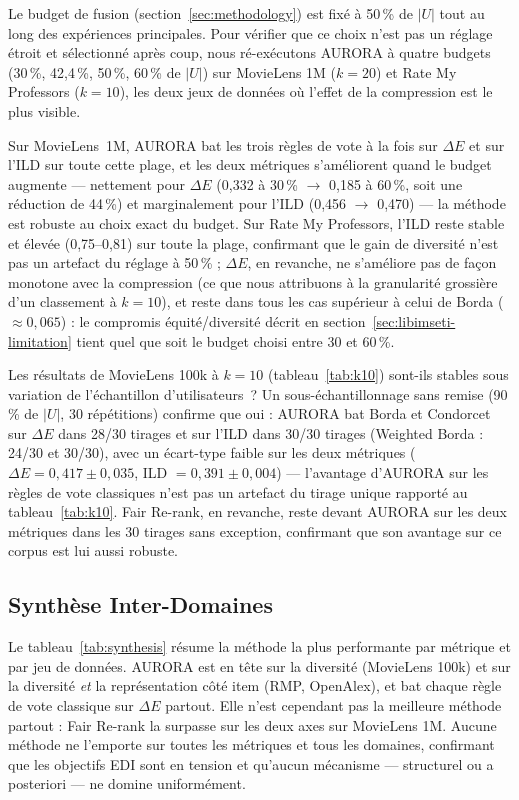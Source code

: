 \documentclass[12pt]{report}
\begin{document}
Le budget de fusion (section~\ref{sec:methodology}) est fixé à 50\,\% de
$|U|$ tout au long des expériences principales. Pour vérifier que ce
choix n'est pas un réglage étroit et sélectionné après coup, nous
ré-exécutons AURORA à quatre budgets (30\,\%, 42,4\,\%, 50\,\%, 60\,\% de
$|U|$) sur MovieLens 1M ($k=20$) et Rate My Professors ($k=10$), les deux
jeux de données où l'effet de la compression est le plus visible.

Sur MovieLens~1M, AURORA bat les trois règles de vote à la fois sur
$\Delta E$ et sur l'ILD sur toute cette plage, et les deux métriques
s'améliorent quand le budget augmente --- nettement pour $\Delta E$
(0,332 à 30\,\% $\to$ 0,185 à 60\,\%, soit une réduction de 44\,\%) et
marginalement pour l'ILD (0,456 $\to$ 0,470) --- la méthode est robuste
au choix exact du budget. Sur Rate My Professors, l'ILD reste
stable et élevée (0,75--0,81) sur toute la plage, confirmant que le gain
de diversité n'est pas un artefact du réglage à 50\,\% ; $\Delta E$, en
revanche, ne s'améliore pas de façon monotone avec la compression (ce
que nous attribuons à la granularité grossière d'un classement à
$k=10$), et reste dans tous les cas supérieur à celui de Borda
($\approx 0{,}065$) : le compromis équité/diversité décrit en
section~\ref{sec:libimseti-limitation} tient quel que soit le budget
choisi entre 30 et 60\,\%.

Les résultats de MovieLens 100k à $k=10$ (tableau~\ref{tab:k10}) sont-ils
stables sous variation de l'échantillon d'utilisateurs~? Un
sous-échantillonnage sans remise (90\,\% de $|U|$, 30 répétitions)
confirme que oui : AURORA bat Borda et Condorcet sur $\Delta E$ dans
28/30 tirages et sur l'ILD dans 30/30 tirages (Weighted Borda : 24/30 et
30/30), avec un écart-type faible sur les deux métriques ($\Delta E =
0{,}417 \pm 0{,}035$, ILD $= 0{,}391 \pm 0{,}004$) --- l'avantage
d'AURORA sur les règles de vote classiques n'est pas un artefact du
tirage unique rapporté au tableau~\ref{tab:k10}. Fair Re-rank, en
revanche, reste devant AURORA sur les deux métriques dans les 30 tirages
sans exception, confirmant que son avantage sur ce corpus est lui aussi
robuste.

\subsection{Synthèse Inter-Domaines}

Le tableau~\ref{tab:synthesis} résume la méthode la plus performante par
métrique et par jeu de données. AURORA est en tête sur la diversité
(MovieLens 100k) et sur la diversité \emph{et} la représentation côté
item (RMP, OpenAlex), et bat chaque règle de vote classique sur
$\Delta E$ partout. Elle n'est cependant pas la meilleure méthode
partout : Fair Re-rank la surpasse sur les deux axes sur MovieLens 1M.
Aucune méthode ne l'emporte sur toutes les métriques et tous les
domaines, confirmant que les objectifs EDI sont en tension et qu'aucun
mécanisme --- structurel ou a posteriori --- ne domine uniformément.
\end{document}
